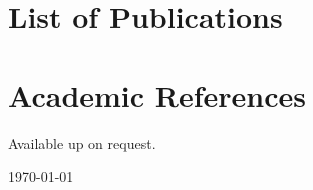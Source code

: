 \documentclass[12pt,a4paper]{moderncv}
\begin{document}
\newpage
\makecvtitle


\newpage
\section{List of Publications}










\section{Academic References}
Available up on request.




\emptysection{}\closesection{}
\vfill 
 \hspace{2.75cm}
 \textcolor{color2}{\today} \hfill %
\end{document}
